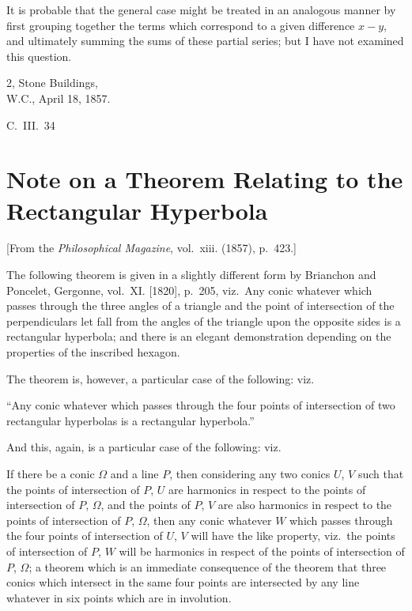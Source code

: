 \documentclass[11pt,a4paper]{article}
\theoremstyle{plain}
\begin{document}
It is probable that the general case might be treated in an analogous manner by first grouping together the terms which correspond to a given difference $x-y$, and ultimately summing the sums of these partial series; but I have not examined this question.

\begin{flushright}
2, Stone Buildings,\\
W.C., April 18, 1857.
\end{flushright}
\hfill C.~III.~34
\newpage


\section{Note on a Theorem Relating to the Rectangular Hyperbola}
\label{sec:206}

[From the \textit{Philosophical Magazine}, vol.~xiii. (1857), p.~423.]
\vspace{1em}

The following theorem is given in a slightly different form by Brianchon and Poncelet, Gergonne, vol.~XI. [1820], p.~205, viz.\ Any conic whatever which passes through the three angles of a triangle and the point of intersection of the perpendiculars let fall from the angles of the triangle upon the opposite sides is a rectangular hyperbola; and there is an elegant demonstration depending on the properties of the inscribed hexagon.

The theorem is, however, a particular case of the following: viz.

``Any conic whatever which passes through the four points of intersection of two rectangular hyperbolas is a rectangular hyperbola.''

And this, again, is a particular case of the following: viz.

If there be a conic $\Omega$ and a line $P$, then considering any two conics $U$, $V$ such that the points of intersection of $P$, $U$ are harmonics in respect to the points of intersection of $P$, $\Omega$, and the points of $P$, $V$ are also harmonics in respect to the points of intersection of $P$, $\Omega$, then any conic whatever $W$ which passes through the four points of intersection of $U$, $V$ will have the like property, viz.\ the points of intersection of $P$, $W$ will be harmonics in respect of the points of intersection of $P$, $\Omega$; a theorem which is an immediate consequence of the theorem that three conics which intersect in the same four points are intersected by any line whatever in six points which are in involution.
\end{document}
